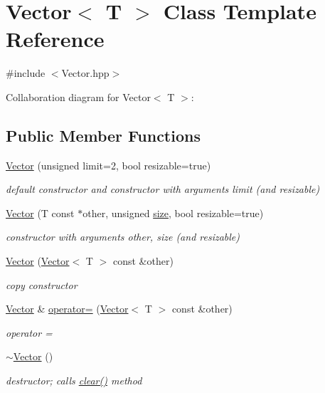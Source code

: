 \hypertarget{classVector}{}\section{Vector$<$ T $>$ Class Template Reference}
\label{classVector}


{\ttfamily \#include $<$Vector.\+hpp$>$}



Collaboration diagram for Vector$<$ T $>$\+:
\subsection*{Public Member Functions}
\begin{DoxyCompactItemize}
\item 
\hyperlink{classVector_a2d2738e562188d3c4e08c3fc7075dc0a}{Vector} (unsigned limit=2, bool resizable=true)
\begin{DoxyCompactList}\small\item\em default constructor and constructor with arguments limit (and resizable) \end{DoxyCompactList}\item 
\hyperlink{classVector_a363b28b2093e32cb4ee93148c065782b}{Vector} (T const $\ast$other, unsigned \hyperlink{classVector_a7eef7a769093f4486f3b2083436bf270}{size}, bool resizable=true)
\begin{DoxyCompactList}\small\item\em constructor with arguments other, size (and resizable) \end{DoxyCompactList}\item 
\hyperlink{classVector_a857e13a3af4fb6e3eea77935cfcd4ef2}{Vector} (\hyperlink{classVector}{Vector}$<$ T $>$ const \&other)
\begin{DoxyCompactList}\small\item\em copy constructor \end{DoxyCompactList}\item 
\hyperlink{classVector}{Vector} \& \hyperlink{classVector_a0feef299594680034402e23ff28b9f45}{operator=} (\hyperlink{classVector}{Vector}$<$ T $>$ const \&other)
\begin{DoxyCompactList}\small\item\em operator = \end{DoxyCompactList}\item 
\hyperlink{classVector_afd524fac19e6d3d69db5198ffe2952b0}{$\sim$\+Vector} ()
\begin{DoxyCompactList}\small\item\em destructor; calls \hyperlink{classVector_a32ad98b135472b0ebc5d6cb3ae5d0085}{clear()} method \end{DoxyCompactList}\item 

\end{DoxyCompactItemize}
